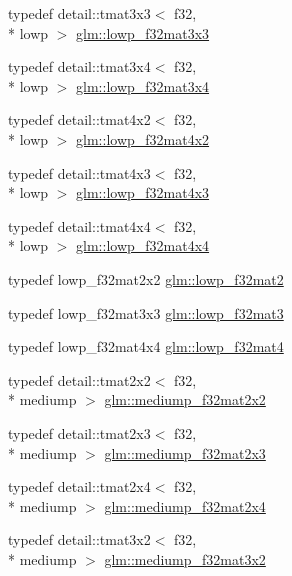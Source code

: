 \begin{DoxyCompactItemize}
\item 
typedef detail\-::tmat3x3$<$ f32, \\*
lowp $>$ \hyperlink{group__gtc__type__precision_ga92f4b130a9651c69361600272f113542}{glm\-::lowp\-\_\-f32mat3x3}
\item 
typedef detail\-::tmat3x4$<$ f32, \\*
lowp $>$ \hyperlink{group__gtc__type__precision_ga7f81032f05c8a1b96b33c328f38c72d3}{glm\-::lowp\-\_\-f32mat3x4}
\item 
typedef detail\-::tmat4x2$<$ f32, \\*
lowp $>$ \hyperlink{group__gtc__type__precision_ga6eedee3981e5bf150ad7463786d0d694}{glm\-::lowp\-\_\-f32mat4x2}
\item 
typedef detail\-::tmat4x3$<$ f32, \\*
lowp $>$ \hyperlink{group__gtc__type__precision_gadd0ff5b09c6ecac83e4e908e3f6478c7}{glm\-::lowp\-\_\-f32mat4x3}
\item 
typedef detail\-::tmat4x4$<$ f32, \\*
lowp $>$ \hyperlink{group__gtc__type__precision_gab7a6454e1f5d5c434ff316b139eb0231}{glm\-::lowp\-\_\-f32mat4x4}
\item 
typedef lowp\-\_\-f32mat2x2 \hyperlink{group__gtc__type__precision_gad717448ef1129d7b795ebcfee6c4944c}{glm\-::lowp\-\_\-f32mat2}
\item 
typedef lowp\-\_\-f32mat3x3 \hyperlink{group__gtc__type__precision_ga84500ab23c0f0f3c585f8ad02f33b88c}{glm\-::lowp\-\_\-f32mat3}
\item 
typedef lowp\-\_\-f32mat4x4 \hyperlink{group__gtc__type__precision_gada4d11f44b410c1be7b6b1d05ccf692c}{glm\-::lowp\-\_\-f32mat4}
\item 
typedef detail\-::tmat2x2$<$ f32, \\*
mediump $>$ \hyperlink{group__gtc__type__precision_ga23c9239d6aa9b41c3d2145e2faa81edb}{glm\-::mediump\-\_\-f32mat2x2}
\item 
typedef detail\-::tmat2x3$<$ f32, \\*
mediump $>$ \hyperlink{group__gtc__type__precision_ga42497d19668931d225bccf1b9c614c19}{glm\-::mediump\-\_\-f32mat2x3}
\item 
typedef detail\-::tmat2x4$<$ f32, \\*
mediump $>$ \hyperlink{group__gtc__type__precision_ga20c5b3b715b70f1c09f7f95bfaa7aa84}{glm\-::mediump\-\_\-f32mat2x4}
\item 
typedef detail\-::tmat3x2$<$ f32, \\*
mediump $>$ \hyperlink{group__gtc__type__precision_ga9762d48bb9b41e3cf40f6e616cf61b6b}{glm\-::mediump\-\_\-f32mat3x2}

\end{DoxyCompactItemize}
